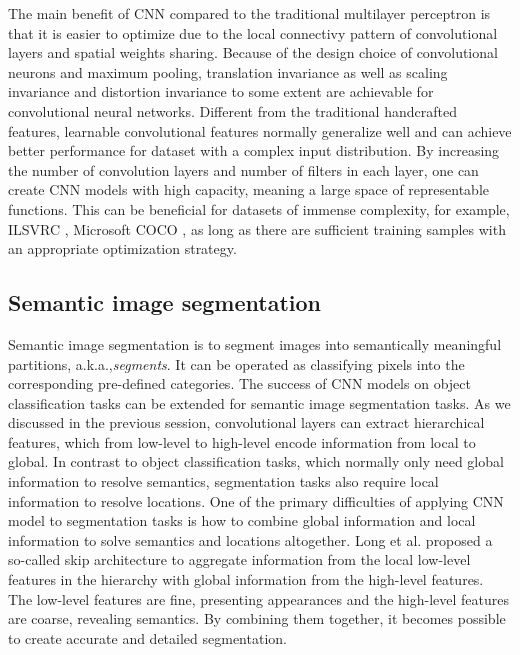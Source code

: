 
The main benefit of CNN compared to the traditional multilayer perceptron is that it is easier to optimize due to the local connectivy pattern of convolutional layers and spatial weights sharing.
Because of the design choice of convolutional neurons and maximum pooling, translation invariance as well as scaling invariance and distortion invariance to some extent are achievable for convolutional neural networks. \cite{lecun1998gradient}
Different from the traditional handcrafted features, learnable convolutional features normally generalize well and can achieve better performance for dataset with a complex input distribution. \cite{krizhevsky2012imagenet}
By increasing the number of convolution layers and number of filters in each layer, one can create CNN models with high capacity, meaning a large space of representable functions.
This can be beneficial for datasets of immense complexity, for example, ILSVRC \cite{russakovsky2015imagenet}, Microsoft COCO \cite{lin2014microsoft}, as long as there are sufficient training samples with an appropriate optimization strategy.


\subsection{Semantic image segmentation}

Semantic image segmentation is to segment images into semantically meaningful partitions, a.k.a.,\textit{segments}.
It can be operated as classifying pixels into the corresponding pre-defined categories.
The success of CNN models on object classification tasks can be extended for semantic image segmentation tasks. \cite{long2015fully}
As we discussed in the previous session, convolutional layers can extract hierarchical features, which from low-level to high-level encode information from local to global.
In contrast to object classification tasks, which normally only need global information to resolve semantics, segmentation tasks also require local information to resolve locations.
One of the primary difficulties of applying CNN model to segmentation tasks is how to combine global information and local information to solve semantics and locations altogether.
Long et al. \cite{long2015fully} proposed a so-called skip architecture to aggregate information from the local low-level features in the hierarchy with global information from the high-level features.
The low-level features are fine, presenting appearances and the high-level features are coarse, revealing semantics.
By combining them together, it becomes possible to create accurate and detailed segmentation.


